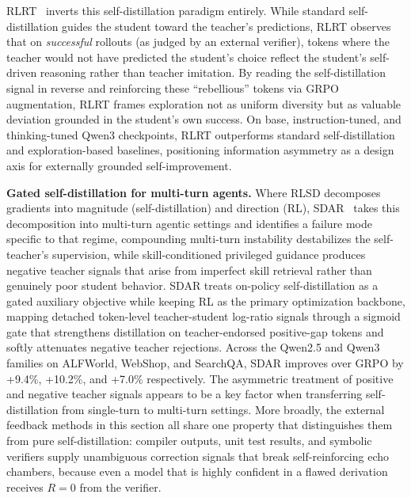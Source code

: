 \documentclass{article} %
\begin{document}
RLRT~\citep{2605.10781} inverts this self-distillation paradigm entirely. While standard self-distillation guides the student toward the teacher's predictions, RLRT observes that on \emph{successful} rollouts (as judged by an external verifier), tokens where the teacher would not have predicted the student's choice reflect the student's self-driven reasoning rather than teacher imitation. By reading the self-distillation signal in reverse and reinforcing these ``rebellious'' tokens via GRPO augmentation, RLRT frames exploration not as uniform diversity but as valuable deviation grounded in the student's own success. On base, instruction-tuned, and thinking-tuned Qwen3 checkpoints, RLRT outperforms standard self-distillation and exploration-based baselines, positioning information asymmetry as a design axis for externally grounded self-improvement.

\textbf{Gated self-distillation for multi-turn agents.} Where RLSD decomposes gradients into magnitude (self-distillation) and direction (RL), SDAR~\citep{2605.15155} takes this decomposition into multi-turn agentic settings and identifies a failure mode specific to that regime, compounding multi-turn instability destabilizes the self-teacher's supervision, while skill-conditioned privileged guidance produces negative teacher signals that arise from imperfect skill retrieval rather than genuinely poor student behavior. SDAR treats on-policy self-distillation as a gated auxiliary objective while keeping RL as the primary optimization backbone, mapping detached token-level teacher-student log-ratio signals through a sigmoid gate that strengthens distillation on teacher-endorsed positive-gap tokens and softly attenuates negative teacher rejections. Across the Qwen2.5 and Qwen3 families on ALFWorld, WebShop, and SearchQA, SDAR improves over GRPO by +9.4\%, +10.2\%, and +7.0\% respectively. The asymmetric treatment of positive and negative teacher signals appears to be a key factor when transferring self-distillation from single-turn to multi-turn settings. More broadly, the external feedback methods in this section all share one property that distinguishes them from pure self-distillation: compiler outputs, unit test results, and symbolic verifiers supply unambiguous correction signals that break self-reinforcing echo chambers, because even a model that is highly confident in a flawed derivation receives $R=0$ from the verifier.
\end{document}

